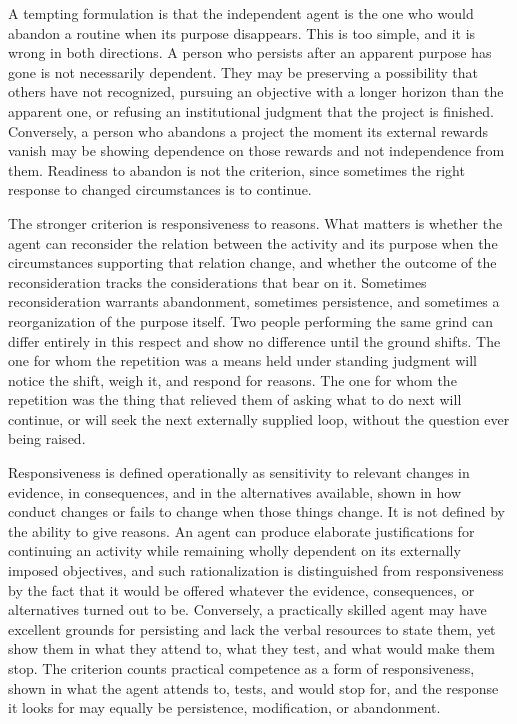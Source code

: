 \documentclass[11pt]{article}
\begin{document}
A tempting formulation is that the independent agent is the one who would abandon a routine when its purpose disappears. This is too simple, and it is wrong in both directions. A person who persists after an apparent purpose has gone is not necessarily dependent. They may be preserving a possibility that others have not recognized, pursuing an objective with a longer horizon than the apparent one, or refusing an institutional judgment that the project is finished. Conversely, a person who abandons a project the moment its external rewards vanish may be showing dependence on those rewards and not independence from them. Readiness to abandon is not the criterion, since sometimes the right response to changed circumstances is to continue.

The stronger criterion is responsiveness to reasons. What matters is whether the agent can reconsider the relation between the activity and its purpose when the circumstances supporting that relation change, and whether the outcome of the reconsideration tracks the considerations that bear on it. Sometimes reconsideration warrants abandonment, sometimes persistence, and sometimes a reorganization of the purpose itself. Two people performing the same grind can differ entirely in this respect and show no difference until the ground shifts. The one for whom the repetition was a means held under standing judgment will notice the shift, weigh it, and respond for reasons. The one for whom the repetition was the thing that relieved them of asking what to do next will continue, or will seek the next externally supplied loop, without the question ever being raised.

Responsiveness is defined operationally as sensitivity to relevant changes in evidence, in consequences, and in the alternatives available, shown in how conduct changes or fails to change when those things change. It is not defined by the ability to give reasons. An agent can produce elaborate justifications for continuing an activity while remaining wholly dependent on its externally imposed objectives, and such rationalization is distinguished from responsiveness by the fact that it would be offered whatever the evidence, consequences, or alternatives turned out to be. Conversely, a practically skilled agent may have excellent grounds for persisting and lack the verbal resources to state them, yet show them in what they attend to, what they test, and what would make them stop. The criterion counts practical competence as a form of responsiveness, shown in what the agent attends to, tests, and would stop for, and the response it looks for may equally be persistence, modification, or abandonment.
\end{document}
